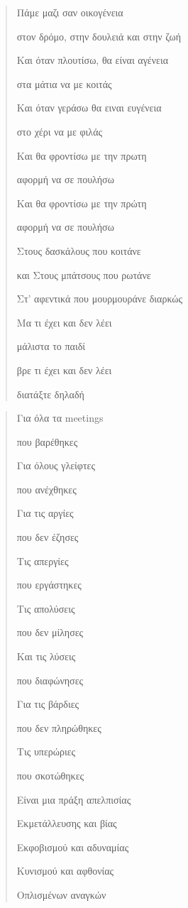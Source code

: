 \documentclass[12pt]{article}
\begin{document}
\begin{verse}
\end{verse}


\begin{verse}
  Πάμε μαζι σαν οικογένεια

  στον δρόμο, στην δουλειά και στην ζωή

  Και όταν πλουτίσω, θα είναι αγένεια

  στα μάτια να με κοιτάς

  Και όταν γεράσω θα ειναι ευγένεια

  στο χέρι να με φιλάς



  Και θα φροντίσω με την πρωτη

  αφορμή να σε πουλήσω

  Και θα φροντίσω με την πρώτη

  αφορμή να σε πουλήσω



  Στους δασκάλους που κοιτάνε

  και Στους μπάτσους που ρωτάνε

  Στ' αφεντικά που μουρμουράνε διαρκώς



  Μα τι έχει και δεν λέει

  μάλιστα το παιδί

  βρε τι έχει και δεν λέει

  διατάξτε δηλαδή


\end{verse}

\begin{verse}
  Για όλα τα meetings

  που βαρέθηκες

  Για όλους γλείφτες

  που ανέχθηκες

  Για τις αργίες

  που δεν έζησες

  Τις απεργίες

  που εργάστηκες

  Τις απολύσεις

  που δεν μίλησες

  Και τις λύσεις

  που διαφώνησες

  Για τις βάρδιες

  που δεν πληρώθηκες

  Τις υπερώριες

  που σκοτώθηκες

  Είναι μια πράξη απελπισίας

  Εκμετάλλευσης και βίας

  Εκφοβισμού και αδυναμίας

  Κυνισμού και αφθονίας

  Οπλισμένων αναγκών

\end{verse}
\end{document}
